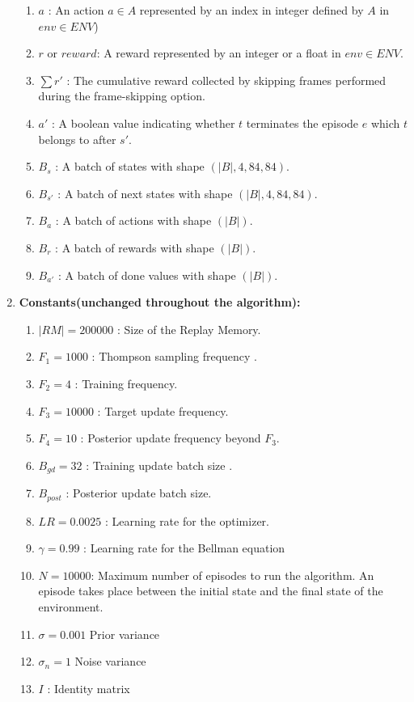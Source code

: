 \documentclass{article}
\begin{document}
\begin{enumerate}
\begin{enumerate}
        \item$a$ : An action $a \in A$ represented by an index in integer defined by $A$ in $env \in ENV$)
        \item$r$ or $reward$: A reward represented by an integer or a float in $env \in ENV$.
        \item$\sum{r'}$ : The cumulative reward collected by skipping frames performed during the frame-skipping option.
        \item$a'$ : A boolean value indicating whether $t$ terminates the episode $e$ which $t$ belongs to after $s'$.
        \item$B_s$ : A batch of states with shape $(|B|,4,84,84)$.
        \item$B_{s'}$ : A batch of next states with shape $(|B|,4,84,84)$.
        \item$B_a$ : A batch of actions with shape $(|B|)$.
        \item$B_r$ : A batch of rewards with shape $(|B|)$.
        \item$B_{a'}$ : A batch of done values with shape $(|B|)$.
    \end{enumerate}
    \item\textbf{Constants(unchanged throughout the algorithm):}
    \begin{enumerate}
        \item$|RM|=200000$ : Size of the Replay Memory.
        \item$F_1=1000$ : Thompson sampling frequency .
        \item$F_2=4$ : Training frequency.
        \item$F_3=10000$ : Target update frequency.
        \item$F_4=10$ : Posterior update frequency beyond $F_3$.
        \item$B_{gd}=32$ : Training update batch size .
        \item$B_{post}$ : Posterior update batch size.
        \item$LR=0.0025$ : Learning rate for the optimizer.
        \item$\gamma=0.99$ : Learning rate for the Bellman equation
        \item$N=10000$: Maximum number of episodes to run the algorithm. An episode takes place between the initial state and the final state of the environment.
        \item$\sigma = 0.001$ Prior variance
        \item$\sigma_n = 1$ Noise variance
        \item$I$ : Identity matrix

\end{enumerate}
\end{enumerate}
\end{document}
